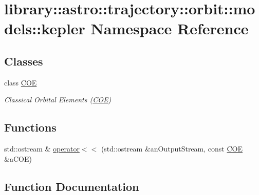 \hypertarget{namespacelibrary_1_1astro_1_1trajectory_1_1orbit_1_1models_1_1kepler}{}\section{library\+:\+:astro\+:\+:trajectory\+:\+:orbit\+:\+:models\+:\+:kepler Namespace Reference}
\label{namespacelibrary_1_1astro_1_1trajectory_1_1orbit_1_1models_1_1kepler}
\subsection*{Classes}
\begin{DoxyCompactItemize}
\item 
class \hyperlink{classlibrary_1_1astro_1_1trajectory_1_1orbit_1_1models_1_1kepler_1_1_c_o_e}{C\+OE}
\begin{DoxyCompactList}\small\item\em Classical Orbital Elements (\hyperlink{classlibrary_1_1astro_1_1trajectory_1_1orbit_1_1models_1_1kepler_1_1_c_o_e}{C\+OE}) \end{DoxyCompactList}\end{DoxyCompactItemize}
\subsection*{Functions}
\begin{DoxyCompactItemize}
\item 
std\+::ostream \& \hyperlink{namespacelibrary_1_1astro_1_1trajectory_1_1orbit_1_1models_1_1kepler_ae4e877a09aad186c4f28f86ef61f560e}{operator$<$$<$} (std\+::ostream \&an\+Output\+Stream, const \hyperlink{classlibrary_1_1astro_1_1trajectory_1_1orbit_1_1models_1_1kepler_1_1_c_o_e}{C\+OE} \&a\+C\+OE)
\end{DoxyCompactItemize}


\subsection{Function Documentation}
\mbox{\label{namespacelibrary_1_1astro_1_1trajectory_1_1orbit_1_1models_1_1kepler_ae4e877a09aad186c4f28f86ef61f560e}} 
